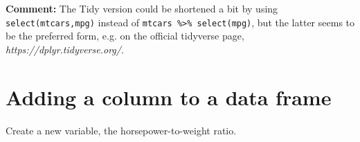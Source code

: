 \documentclass[11pt]{article}
\begin{document}
\begin{parcolumns}[rulebetween=true]{2}


\hspace{0.1in}


\end{parcolumns}

\textbf{Comment:}  The Tidy version could be shortened a bit by using
\lstinline{select(mtcars,mpg)} instead of 
\lstinline{mtcars %>% select(mpg)}, 
but the latter seems to be the preferred form,
e.g. on the official tidyverse page, \textit{https://dplyr.tidyverse.org/}.  

\section*{Adding a column to a data frame}

Create a new variable, the horsepower-to-weight ratio.
\end{document}
